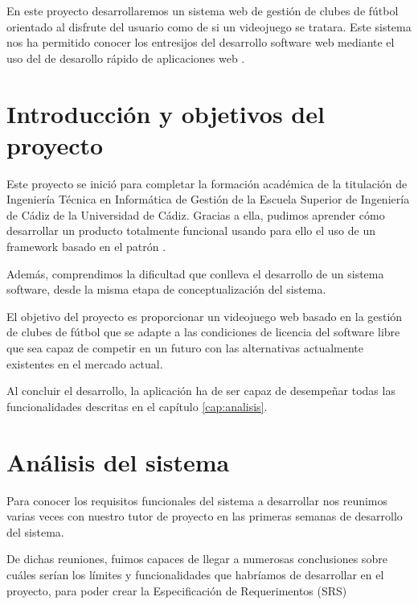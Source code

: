 

En este proyecto desarrollaremos un sistema web de gestión de clubes de fútbol orientado al disfrute
del usuario como de si un videojuego se tratara. Este sistema nos ha permitido
conocer los entresijos del desarrollo software web mediante el uso del
 de desarollo rápido de aplicaciones web .

\section{Introducción y objetivos del proyecto}
Este proyecto se inició para completar la formación académica de la titulación
de Ingeniería Técnica en Informática de Gestión de la Escuela Superior de
Ingeniería de Cádiz de la Universidad de Cádiz. Gracias a ella, pudimos aprender
cómo desarrollar un producto totalmente funcional usando para ello el uso de un
framework basado en el patrón  . 

Además, comprendimos la dificultad que conlleva el desarrollo de un sistema
software, desde la misma etapa de conceptualización del sistema.

El objetivo del proyecto es proporcionar un videojuego web basado en la gestión
de clubes de fútbol que se adapte a las condiciones de licencia del software
libre que sea capaz de competir en un futuro con las alternativas actualmente
existentes en el mercado actual.

Al concluir el desarrollo, la aplicación ha de ser capaz de desempeñar todas las
funcionalidades descritas en el capítulo \ref{cap:analisis}.

\section{Análisis del sistema}
Para conocer los requisitos funcionales del sistema a desarrollar nos reunimos
varias veces con nuestro tutor de proyecto en las primeras semanas de desarrollo
del sistema.

De dichas reuniones, fuimos capaces de llegar a numerosas conclusiones sobre
cuáles serían los límites y funcionalidades que habríamos de desarrollar en el
proyecto, para poder crear la Especificación de Requerimentos (SRS)
\cite{doc:requisitos}

